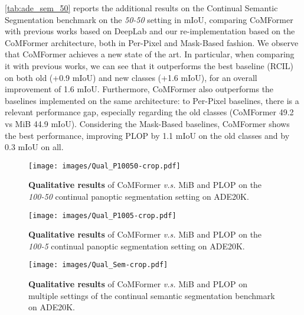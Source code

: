 \documentclass[10pt,twocolumn,letterpaper]{article}
\begin{document}
\cref{tab:ade_sem_50} reports the additional results on the Continual Semantic Segmentation benchmark on the \textit{50-50} setting in mIoU, comparing CoMFormer with previous works based on DeepLab \cite{chen2017deeplabv3} and our re-implementation based on the CoMFormer architecture, both in Per-Pixel and Mask-Based fashion.
We observe that CoMFormer achieves a new state of the art. In particular, when comparing it with previous works, we can see that it outperforms the best baseline (RCIL) on both old (+0.9 mIoU) and new classes (+1.6 mIoU), for an overall improvement of 1.6 mIoU. Furthermore, CoMFormer also outperforms the baselines implemented on the same architecture: \wrt to Per-Pixel baselines, there is a relevant performance gap, especially regarding the old classes (CoMFormer 49.2 vs MiB 44.9 mIoU). Considering the Mask-Based baselines, CoMFormer shows the best performance, improving PLOP by 1.1 mIoU on the old classes and by 0.3 mIoU on all. 


\begin{figure*}
    \centering
    \texttt{[image: images/Qual\_P10050-crop.pdf]}
    \caption{\textbf{Qualitative results} of CoMFormer \textit{v.s.} MiB and PLOP on the \textit{100-50} continual panoptic segmentation setting on ADE20K.}
    \label{fig:qr_P10050} \vspace{-1em}
\end{figure*}
\begin{figure*}
    \centering
    \texttt{[image: images/Qual\_P1005-crop.pdf]}
    \caption{\textbf{Qualitative results} of CoMFormer \textit{v.s.} MiB and PLOP on the \textit{100-5} continual panoptic segmentation setting on ADE20K.}
    \label{fig:qr_P1005}  \vspace{-1em}
\end{figure*}
\begin{figure*}
    \centering
    \texttt{[image: images/Qual\_Sem-crop.pdf]}
    \caption{\textbf{Qualitative results} of CoMFormer \textit{v.s.} MiB and PLOP on multiple settings of the continual semantic segmentation benchmark on ADE20K.}
    \label{fig:qualitative_results} \vspace{-1em}
    \label{fig:qr_Seg} 
\end{figure*}
\end{document}
